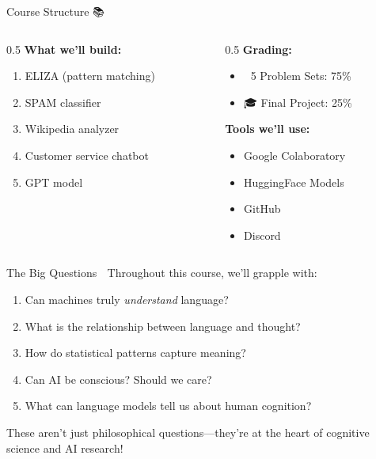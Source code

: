 \documentclass[aspectratio=169]{beamer}
\begin{document}
\begin{frame}[shrink=10]{Course Structure 📚}
\begin{columns}
\begin{column}{0.5\textwidth}
\textbf{What we'll build:}
\begin{enumerate}\setlength{\itemsep}{0pt}
    \item ELIZA (pattern matching)
    \item SPAM classifier
    \item Wikipedia analyzer
    \item Customer service chatbot
    \item GPT model
\end{enumerate}
\end{column}

\begin{column}{0.5\textwidth}
\textbf{Grading:}
\begin{itemize}\setlength{\itemsep}{0pt}
    \item 📝 5 Problem Sets: 75\%
    \item 🎓 Final Project: 25\%
\end{itemize}

\vspace{0.15cm}

\textbf{Tools we'll use:}
\begin{itemize}\setlength{\itemsep}{0pt}
    \item Google Colaboratory
    \item HuggingFace Models
    \item GitHub
    \item Discord
\end{itemize}
\end{column}
\end{columns}
\end{frame}

\begin{frame}{The Big Questions 🌟}
\small
Throughout this course, we'll grapple with:

\begin{enumerate}\setlength{\itemsep}{0pt}
    \item Can machines truly \textit{understand} language?
    \item What is the relationship between language and thought?
    \item How do statistical patterns capture meaning?
    \item Can AI be conscious? Should we care?
    \item What can language models tell us about human cognition?
\end{enumerate}

\vspace{0.3cm}

\begin{thinkaboutit}
These aren't just philosophical questions—they're at the heart of cognitive science and AI research!
\end{thinkaboutit}
\end{frame}
\end{document}
